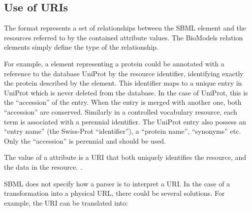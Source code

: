 \subsection{Use of URIs}
\label{sec:uri-in-annotation}

The format represents a set of relationships between the SBML
element and the resources referred to by the contained
 attribute values.  The BioModels relation
elements simply define the type of the relationship.

For example, a \Species element representing a protein could be
annotated with a reference to the database UniProt by the
 resource identifier,
identifying exactly the protein described by the \Species element.
This identifier maps to a unique entry in UniProt which is never
deleted from the database. In the case of UniProt, this is the
``accession'' of the entry. When the entry is merged with another
one, both ``accession'' are conserved. Similarly in a controlled
vocabulary resource, each term is associated with a perennial
identifier. The UniProt entry also possess an ``entry name'' (the
Swiss-Prot ``identifier''), a ``protein name'', ``synonyms'' etc.
Only the ``accession'' is perennial and should be used.

The value of a  attribute is a URI that both
uniquely identifies the resource, and the data in the resource. 
   .

\begin{blockChanged}

SBML does not specify how a parser is to interpret a URI. In the
case of a transformation into a physical URL, there could be
several solutions. For example, the URI
 can be translated
into:

\end{blockChanged}

\noindent {}\\
\noindent {}\\
\noindent {}

